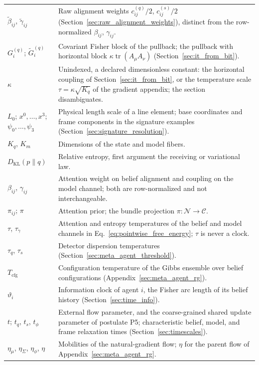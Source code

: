 \documentclass[11pt]{article}
\begin{document}
{\begin{longtable}{@{}p{}p{}@{}}
$\tilde\beta_{ij}$, $\tilde\gamma_{ij}$ & Raw alignment weights $c^{(q)}_{ij}/2$, $c^{(s)}_{ij}/2$ (Section~\ref{sec:raw_alignment_weights}), distinct from the row-normalized $\beta_{ij}$, $\gamma_{ij}$. \\
$G^{(q)}_i$; $\widetilde{G}^{(q)}_i$ & Covariant Fisher block of the pullback; the pullback with horizontal block $\kappa\operatorname{tr}(A_\mu A_\nu)$ (Section~\ref{sec:it_from_bit}). \\
$\kappa$ & Unindexed, a declared dimensionless constant: the horizontal coupling of Section~\ref{sec:it_from_bit}, or the temperature scale $\tau=\kappa\sqrt{K_q}$ of the gradient appendix; the section disambiguates. \\
$L_0$; $x^0,\ldots,x^3$; $\psi_0,\ldots,\psi_3$ & Physical length scale of a line element; base coordinates and frame components in the signature examples (Section~\ref{sec:signature_resolution}). \\
$K_q$, $K_m$ & Dimensions of the state and model fibers. \\
$D_{\mathrm{KL}}(p\|q)$ & Relative entropy, first argument the receiving or variational law. \\
$\beta_{ij}$, $\gamma_{ij}$ & Attention weight on belief alignment and coupling on the model channel; both are row-normalized and not interchangeable. \\
$\pi_{ij}$; $\pi$ & Attention prior; the bundle projection $\pi:\mathcal{N}\to\mathcal{C}$. \\
$\tau$, $\tau_\gamma$ & Attention and entropy temperatures of the belief and model channels in Eq.~\eqref{eq:pointwise_free_energy}; $\tau$ is never a clock. \\
$\tau_q$, $\tau_s$ & Detector dispersion temperatures (Section~\ref{sec:meta_agent_threshold}). \\
$T_{\mathrm{cfg}}$ & Configuration temperature of the Gibbs ensemble over belief configurations (Appendix~\ref{sec:meta_agent_rg}). \\
$\vartheta_i$ & Information clock of agent $i$, the Fisher arc length of its belief history (Section~\ref{sec:time_info}). \\
$t$; $t_q$, $t_s$, $t_\phi$ & External flow parameter, and the coarse-grained shared update parameter of postulate P5; characteristic belief, model, and frame relaxation times (Section~\ref{sec:timescales}). \\
$\eta_\mu$, $\eta_\Sigma$, $\eta_\phi$, $\eta$ & Mobilities of the natural-gradient flow; $\eta$ for the parent flow of Appendix~\ref{sec:meta_agent_rg}. \\

\end{longtable}}
\end{document}
